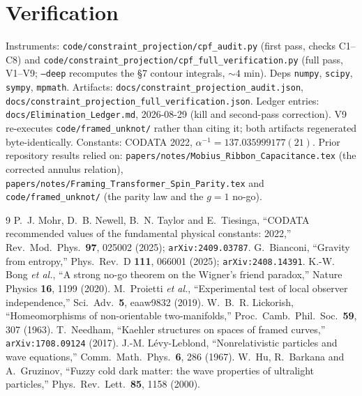 \documentclass[11pt,a4paper]{article}
\begin{document}
\section*{Verification}

Instruments: \texttt{code/constraint\_projection/cpf\_audit.py} (first pass, checks
C1--C8) and \texttt{code/constraint\_projection/cpf\_full\_verification.py} (full
pass, V1--V9; \texttt{--deep} recomputes the \S7 contour integrals, ${\sim}4$ min).
Deps \texttt{numpy}, \texttt{scipy}, \texttt{sympy}, \texttt{mpmath}. Artifacts:
\texttt{docs/constraint\_projection\_audit.json},
\texttt{docs/constraint\_projection\_full\_verification.json}. Ledger entries:
\texttt{docs/Elimination\_Ledger.md}, 2026-08-29 (kill and second-pass correction).
V9 re-executes \texttt{code/framed\_unknot/} rather than citing it; both artifacts
regenerated byte-identically. Constants: CODATA 2022,
$\alpha^{-1} = 137.035999177(21)$. Prior repository results relied on:
\texttt{papers/notes/Mobius\_Ribbon\_Capacitance.tex} (the corrected annulus
relation), \texttt{papers/notes/Framing\_Transformer\_Spin\_Parity.tex} and
\texttt{code/framed\_unknot/} (the parity law and the $g=1$ no-go).

\begin{thebibliography}{9}
 P.~J. Mohr, D.~B. Newell, B.~N. Taylor and E.~Tiesinga,
  ``CODATA recommended values of the fundamental physical constants: 2022,''
  Rev.\ Mod.\ Phys.\ \textbf{97}, 025002 (2025); \verb|arXiv:2409.03787|.
 G.~Bianconi, ``Gravity from entropy,''
  Phys.\ Rev.\ D \textbf{111}, 066001 (2025); \verb|arXiv:2408.14391|.
 K.-W. Bong \emph{et al.}, ``A strong no-go theorem on the
  Wigner's friend paradox,'' Nature Physics \textbf{16}, 1199 (2020).
 M.~Proietti \emph{et al.}, ``Experimental test of local
  observer independence,'' Sci.\ Adv.\ \textbf{5}, eaaw9832 (2019).
 W.~B.~R. Lickorish, ``Homeomorphisms of non-orientable
  two-manifolds,'' Proc.\ Camb.\ Phil.\ Soc.\ \textbf{59}, 307 (1963).
 T.~Needham, ``Kaehler structures on spaces of framed
  curves,'' \verb|arXiv:1708.09124| (2017).
 J.-M. L\'evy-Leblond, ``Nonrelativistic particles and
  wave equations,'' Comm.\ Math.\ Phys.\ \textbf{6}, 286 (1967).
 W.~Hu, R.~Barkana and A.~Gruzinov, ``Fuzzy cold dark matter:
  the wave properties of ultralight particles,'' Phys.\ Rev.\ Lett.\ \textbf{85},
  1158 (2000).
\end{thebibliography}
\end{document}
